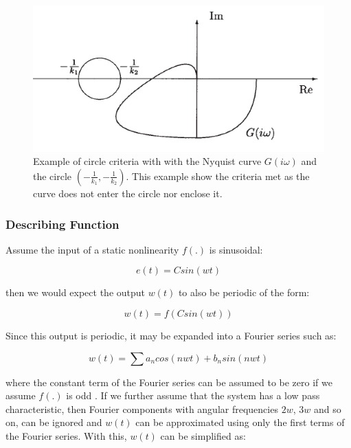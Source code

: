 \documentclass[a4paper, titlepage]{article}
\begin{document}
\begin{figure}[h!]
\center
\includegraphics[scale=1]{../figures/circleExample.png}
\caption{Example of circle criteria with with the Nyquist curve $G(i\omega)$ and the circle $\left(-\frac{1}{k_1}, -\frac{1}{k_2}\right)$. This example show the criteria met as the curve does not enter the circle nor enclose it. \citep[~p.333]{glad00}}
\label{fig:cirEx}
\end{figure}



\subsubsection{Describing Function}
Assume the input of a static nonlinearity $f(.)$ is sinusoidal:

\begin{equation}
	e(t) = Csin(wt)
	\label{equ:input_e}
\end{equation}

then we would expect the output $w(t)$ to also be periodic of the form:

\begin{equation}
	w(t) = f(Csin(wt))
\end{equation}

Since this output is periodic, it may be expanded into a Fourier series such as:

\begin{equation}
	w(t) = \sum{a_{n}cos(nwt)+b_{n}sin(nwt)}
\end{equation}

where the constant term of the Fourier series can be assumed to be zero if we assume $f(.)$ is odd \citep[p. 358]{glad00}.  If we further assume that the system has a low pass characteristic, then Fourier components with angular frequencies $2w$, $3w$ and so on, can be ignored and $w(t)$ can be approximated using only the first terms of the Fourier series.  With this, $w(t)$ can be simplified as:
\end{document}
